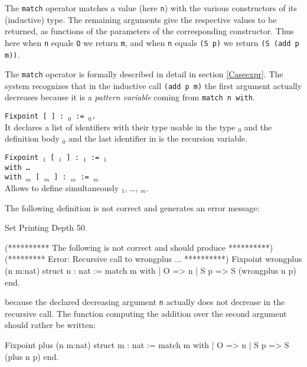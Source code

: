 The {\tt match} operator matches a value (here \verb:n:) with the
various constructors of its (inductive) type. The remaining arguments
give the respective values to be returned, as functions of the
parameters of the corresponding constructor. Thus here when \verb:n:
equals \verb:O: we return \verb:m:, and when \verb:n: equals 
\verb:(S p): we return \verb:(S (add p m)):.

The {\tt match} operator is formally described
in detail in section \ref{Caseexpr}.  The system recognizes that in
the inductive call {\tt (add p m)} the first argument actually
decreases because it is a {\em pattern variable} coming from {\tt match
  n with}.

\begin{Variants}
\item {\tt Fixpoint {\ident} [ {\params} ] : \type$_0$ :=
\term$_0$.}\\
        It declares a list of identifiers with their type
        usable in the type \type$_0$ and the definition body \term$_0$
        and the last identifier in {\params} is the recursion variable.
\item {\tt Fixpoint {\ident$_1$} [ {\params$_1$} ] :
        {\type$_1$} := {\term$_1$}\\
        with {\ldots} \\
        with {\ident$_m$}  [ {\params$_m$} ] : {\type$_m$} := 
        {\type$_m$}}\\
        Allows to define simultaneously {\ident$_1$}, {\ldots},
        {\ident$_m$}.
\end{Variants}

\Example The following definition is not correct and generates an
error message:

\begin{coq_eval}
Set Printing Depth 50.
\end{coq_eval}
\begin{coq_example}
(********** The following is not correct and should produce **********)
(*********      Error: Recursive call to wrongplus ...      **********)
Fixpoint wrongplus (n m:nat) {struct n} : nat :=
  match m with
  | O => n
  | S p => S (wrongplus n p)
  end.
\end{coq_example}

because the declared decreasing argument {\tt n} actually does not
decrease in the recursive call.  The function computing the addition
over the second argument should rather be written:

\begin{coq_example*}
Fixpoint plus (n m:nat) {struct m} : nat :=
  match m with
  | O => n
  | S p => S (plus n p)
  end.
\end{coq_example*}

